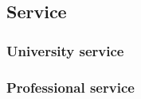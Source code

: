 \subsection{Service}

\subsubsection{University service}


\subsubsection{Professional service}




